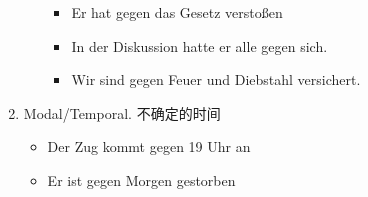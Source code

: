 \documentclass[UTF8]{report}
\begin{document}
\begin{enumerate}
\begin{enumerate}
\begin{itemize}
            \item Er hat gegen das Gesetz verstoßen
            \item In der Diskussion hatte er alle gegen sich.
            \item Wir sind gegen Feuer und Diebstahl versichert.
        \end{itemize}
    \end{enumerate}
    \item Modal/Temporal. 不确定的时间
    \begin{itemize}
        \item Der Zug kommt gegen 19 Uhr an
        \item Er ist gegen Morgen gestorben
    \end{itemize}
\end{enumerate}
\end{document}
